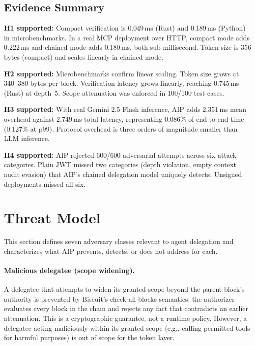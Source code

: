 \documentclass[11pt,a4paper]{article}
\newcommand{\aip}{\textsc{AIP}}
\begin{document}
\subsection{Evidence Summary}
\label{sec:evidence}

\textbf{H1 supported:} Compact verification is 0.049\,ms (Rust) and 0.189\,ms (Python) in microbenchmarks. In a real MCP deployment over HTTP, compact mode adds 0.222\,ms and chained mode adds 0.180\,ms, both sub-millisecond. Token size is 356 bytes (compact) and scales linearly in chained mode.

\textbf{H2 supported:} Microbenchmarks confirm linear scaling. Token size grows at 340--380 bytes per block. Verification latency grows linearly, reaching 0.745\,ms (Rust) at depth~5. Scope attenuation was enforced in 100/100 test cases.

\textbf{H3 supported:} With real Gemini 2.5 Flash inference, \aip{} adds 2.351\,ms mean overhead against 2,749\,ms total latency, representing 0.086\% of end-to-end time (0.127\% at p99). Protocol overhead is three orders of magnitude smaller than LLM inference.

\textbf{H4 supported:} \aip{} rejected 600/600 adversarial attempts across six attack categories. Plain JWT missed two categories (depth violation, empty context audit evasion) that \aip{}'s chained delegation model uniquely detects. Unsigned deployments missed all six.

\section{Threat Model}
\label{sec:threat}

This section defines seven adversary classes relevant to agent delegation and characterizes what \aip{} prevents, detects, or does not address for each.

\paragraph{Malicious delegatee (scope widening).} A delegatee that attempts to widen its granted scope beyond the parent block's authority is prevented by Biscuit's check-all-blocks semantics: the authorizer evaluates every block in the chain and rejects any fact that contradicts an earlier attenuation. This is a cryptographic guarantee, not a runtime policy. However, a delegatee acting maliciously within its granted scope (e.g., calling permitted tools for harmful purposes) is out of scope for the token layer.
\end{document}
